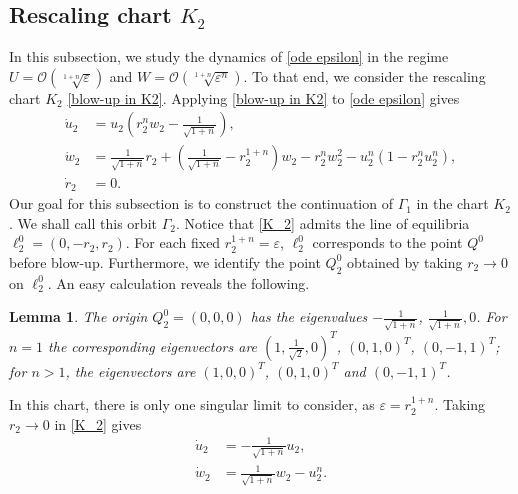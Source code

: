 \documentclass[10pt,a4paper]{amsart}
\newtheorem{lem}{Lemma}
\begin{document}
\subsection{Rescaling chart $K_2$}
In this subsection, we study the dynamics of \eqref{ode epsilon} in the regime $U=\mathcal{O}(\sqrt[1+n]{\varepsilon})$ and $W=\mathcal{O}(\sqrt[1+n]{\varepsilon^n})$. To that end, we consider the rescaling chart $K_2$ \eqref{blow-up in K2}.
Applying \eqref{blow-up in K2} to \eqref{ode epsilon} gives 
\begin{equation}
    \begin{aligned}
        \dot{u}_2&=u_2\left(r_2^nw_2-\tfrac{1}{\sqrt{1+n}}\right),\\
        \dot{w}_2&=\tfrac{1}{\sqrt{1+n}}r_2+\left(\tfrac{1}{\sqrt{1+n}}-r_2^{1+n}\right)w_2-r_2^nw_2^2-u_2^n(1-r_2^nu_2^n),\\
        \dot{r}_2&=0.
        \label{K_2}
    \end{aligned}
\end{equation}
Our goal for this subsection is to construct the continuation of $\Gamma_1$ in the chart $K_2$. We shall call this orbit $\Gamma_2$. Notice that \eqref{K_2} admits the line of equilibria $\ell_2^0=(0, -r_2, r_2)$. For each fixed $r_2^{1+n}=\varepsilon$, $\ell_2^0$ corresponds to the point $Q^0$ before blow-up. Furthermore, we identify the point $Q_2^0$ obtained by taking $r_2\to 0$ on $\ell_2^0$. An easy calculation reveals the following.
\begin{lem}
    The origin $Q^0_2=(0,0,0)$ has the eigenvalues $-\tfrac{1}{\sqrt{1+n}}$, $\tfrac{1}{\sqrt{1+n}}, 0$. For $n=1$
    the corresponding eigenvectors are  $\left(1, \tfrac{1}{\sqrt{2}}, 0\right)^T$, $(0,1, 0)^T$, $(0, -1, 1)^T$; for $n>1$, the eigenvectors are $(1,0,0)^T$, $(0,1,0)^T$ and $(0,-1,1)^T$. 
    \label{lem: K_2 linear}
\end{lem}
In this chart, there is only one singular limit to consider, as $\varepsilon=r_2^{1+n}$. Taking $r_2\to0$ in \eqref{K_2} gives 
\begin{equation}
    \begin{aligned}
        \dot{u}_2&=-\tfrac{1}{\sqrt{1+n}}u_2,\\
        \dot{w}_2&=\tfrac{1}{\sqrt{1+n}}w_2-u_2^n.
        \label{K_2 SL}
    \end{aligned}
\end{equation}
\end{document}
